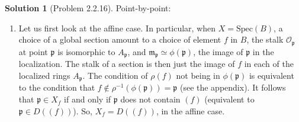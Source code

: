 \documentclass[aps,pra,showpacs,notitlepage,onecolumn,superscriptaddress,nofootinbib]{revtex4-1}
\theoremstyle{definition}
\newtheorem{solution}{Solution}[section]
\begin{document}
\begin{solution}[Problem 2.2.16]
  Point-by-point:

  \begin{enumerate}
    \item Let us first look at the affine case. In particular, when $X = \text{Spec}(B)$, a choice of a global section amount to a choice of element $f$ in $B$, the stalk $\mathcal{O}_{\mathfrak{p}}$ at point $\mathfrak{p}$
      is isomorphic to $A_{\mathfrak{p}}$, and $\mathfrak{m}_{\mathfrak{p}} \simeq \phi(\mathfrak{p})$, the image of $\mathfrak{p}$ in the localization. The stalk of a section is then just the image of $f$ in each
      of the localized rings $A_{\mathfrak{p}}$. The condition of $\rho(f)$ not being in $\phi(\mathfrak{p})$ is equivalent to the condition that $f \notin \rho^{-1}(\phi(\mathfrak{p})) = \mathfrak{p}$ (see the appendix).
      It follows that $\mathfrak{p} \in X_f$ if and only if $\mathfrak{p}$ does not contain $(f)$ (equivalent to $\mathfrak{p} \in D((f))$). So, $X_f = D((f))$, in the affine case.


\end{enumerate}
\end{solution}
\end{document}
